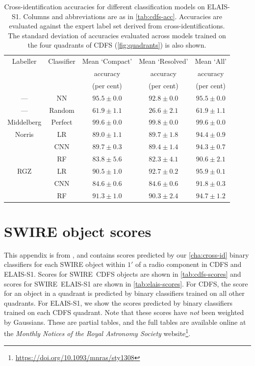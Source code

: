   \begin{table}
    \caption[Cross-identification accuracies for different classification
    models on ELAIS-S1.]{Cross-identification accuracies for different classification
    models on ELAIS-S1. Columns and abbreviations are as in
    \autoref{tab:cdfs-acc}. Accuracies are evaluated against the expert label
    set derived from \citet{middelberg08} cross-identifications. The standard
    deviation of accuracies evaluated across models trained on the four
    quadrants of CDFS (\autoref{fig:quadrants}) is also shown.}
    \label{tab:elais-acc}
    \small\centering
    \begingroup
    \setlength{\tabcolsep}{8pt} %
    \begin{tabular}{ccccc}
      \hline\hline
      Labeller & Classifier & Mean `Compact' & Mean `Resolved' & Mean `All'\\
       &  & accuracy & accuracy & accuracy\\
       &  & (per cent) & (per cent) & (per cent)\\
      \hline
     ---& NN & $95.5 \pm 0.0$ & $92.8 \pm 0.0$ & $95.5 \pm 0.0$\\
     ---& Random & $61.9 \pm 1.1$ & $26.6 \pm 2.1$ & $61.9 \pm 1.1$\\
      Middelberg & Perfect & $99.6 \pm 0.0$ & $99.8 \pm 0.0$ & $99.6 \pm 0.0$\\
      Norris & LR & $89.0 \pm 1.1$ & $89.7 \pm 1.8$ & $94.4 \pm 0.9$\\
             & CNN & $89.7 \pm 0.3$ & $89.4 \pm 1.4$ & $94.3 \pm 0.7$\\
             & RF & $83.8 \pm 5.6$ & $82.3 \pm 4.1$ & $90.6 \pm 2.1$\\
      RGZ & LR & $90.5 \pm 1.0$ & $92.7 \pm 0.2$ & $95.9 \pm 0.1$\\
          & CNN & $84.6 \pm 0.6$ & $84.6 \pm 0.6$ & $91.8 \pm 0.3$\\
          & RF & $91.3 \pm 1.0$ & $90.3 \pm 2.4$ & $94.7 \pm 1.2$\\
      \hline\hline
    \end{tabular}
    \endgroup
  \end{table}

\section{SWIRE object scores}\label{sec:atlas-xid-scores}
  
  This appendix is from \citet{alger18radio}, and contains scores predicted by our \autoref{cha:cross-id} binary classifiers for each
  SWIRE object within $1'$ of a radio component in CDFS and ELAIS-S1. Scores
  for SWIRE~CDFS objects are shown in \autoref{tab:cdfs-scores} and scores for
  SWIRE~ELAIS-S1 are shown in \autoref{tab:elais-scores}. For CDFS, the score
  for an object in a quadrant is predicted by binary classifiers trained on
  all other quadrants. For ELAIS-S1, we show the scores predicted by binary
  classifiers trained on each CDFS quadrant. Note that these scores have
  \emph{not} been weighted by Gaussians. These are partial tables, and the full tables are available online at the \emph{Monthly Notices of the Royal Astronomy Society} website\footnote{\url{https://doi.org/10.1093/mnras/sty1308}}.

